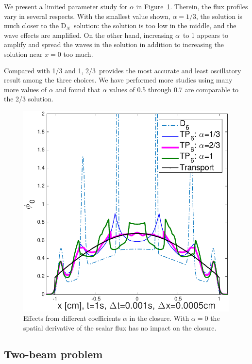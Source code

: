 \documentclass[review]{elsarticle}
\newcommand{\dn}{D$_N$}
\begin{document}
We present a limited parameter study for $\alpha$  in Figure\ \ref{f:tp6coef}. Therein, the flux profiles vary in several respects. With the smallest value shown, $\alpha=1/3$, the solution is much closer to the \dn~solution: the solution is too low in the middle, and the wave effects are amplified. On the other hand, increasing $\alpha$\ to 1 appears to amplify and spread the waves in the solution in addition to increasing the solution near $x=0$ too much.

Compared with 1/3 and 1, $2/3$\ provides the most accurate and least oscillatory result among the three choices. We have performed more  studies using many more values of $\alpha$ and found that  $\alpha$ values of 0.5 through 0.7 are comparable to the 2/3 solution.

\begin{figure}[ht!]

	\centering
	\includegraphics[width=.5\linewidth]{fl7coef_1s.pdf}
	\caption{Effects from different coefficients $\alpha$ in the closure. With $\alpha =0 $ the spatial derivative of the scalar flux has no impact on the closure.}
	\label{f:tp6coef}
\end{figure}



\subsection{Two-beam problem}
\end{document}
